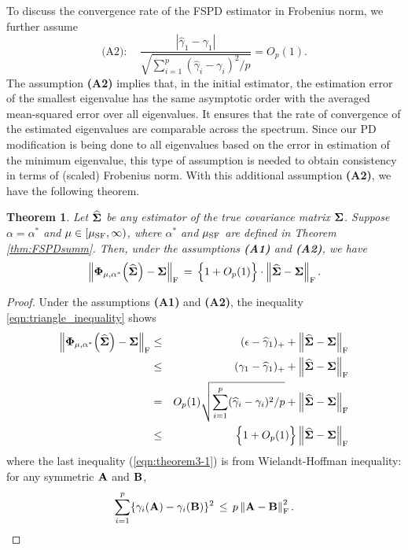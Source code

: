 \documentclass[times,sort&compress,3p]{elsarticle}
\newtheorem{theorem}{Theorem}
\begin{document}
To discuss the convergence rate of the FSPD estimator in Frobenius norm, we further assume
\[
\textrm{(A2)}: \quad \frac{  |{\widehat{\gamma}}_1 - \gamma_1 |}{ \sqrt{\sum_{i=1}^p ({\widehat{\gamma}}_i - \gamma_i)^2 / p} } = O_p ( 1). 
\]
The assumption {\bf (A2)} implies that, in the initial estimator, the estimation error of the smallest eigenvalue
has the same asymptotic order with the averaged mean-squared error over all eigenvalues. It 
ensures that the rate of convergence of the estimated eigenvalues are comparable across the spectrum. 
Since our PD modification is being done to all eigenvalues based on the error in estimation of the minimum 
eigenvalue, this type of assumption is needed to obtain consistency in terms of (scaled) Frobenius norm.
With this additional assumption {\bf (A2)}, we have the following theorem.
%
\begin{theorem}\label{prop:FSPDcov2} 
Let $\widehat{\bf \Sigma}$ be any estimator of the true covariance matrix ${\bf \Sigma}$. Suppose 
$\alpha=\alpha^*$ and $\mu \in [\mu_{\rm SF}, \infty)$, where $\alpha^*$ and $\mu_{\rm SF}$
are defined in Theorem \ref{thm:FSPDsumm}. Then, under the assumptions {\bf (A1)} and {\bf (A2)}, 
we have 
\[
\left\| {\bf \Phi}_{\mu, \alpha^*}\Big(\widehat{\bf \Sigma}\Big) - {\bf \Sigma} \right\|_{\rm F} \,=\,  
	\Big\{ 1 + O_p(1) \Big\} \cdot
	\left\| \widehat{\bf \Sigma} - {\bf \Sigma} \right\|_{\rm F}.
\]
\end{theorem}
\begin{proof}
Under the assumptions {\bf (A1)} and {\bf (A2)}, the inequality \eqref{eqn:triangle_inequality} shows 
\begin{eqnarray}
\left\| {\bf \Phi}_{\mu, \alpha^*}\Big(\widehat{\bf \Sigma}\Big) - {\bf \Sigma} \right\|_{\rm F} &\leq&
	(\epsilon - {\widehat{\gamma}}_1)_+  +  \left\| \widehat{\bf \Sigma} - {\bf \Sigma} \right\|_{\rm F}\nonumber\\
 	&\leq& (\gamma_1 - {\widehat{\gamma}}_1)_+  +  \left\| \widehat{\bf \Sigma} - {\bf \Sigma} \right\|_{\rm F} \nonumber \\
&=&  O_p (1) \sqrt{\sum_{i=1}^p ({\widehat{\gamma}}_i - \gamma_i)^2 / p}+  \left\| \widehat{\bf \Sigma} - {\bf \Sigma}
\right\|_{\rm F} \nonumber \\
&\le & \Big\{ 1 + O_p(1) \Big\}    \left\| \widehat{\bf \Sigma} - {\bf \Sigma} \label{eqn:theorem3-1}
\right\|_{\rm F}
\end{eqnarray}
where the last inequality (\ref{eqn:theorem3-1}) is from Wielandt-Hoffman inequality: for any  symmetric $\bf A$ and $\bf B$,
\[
\sum_{i=1}^{p} \{ \gamma_i({\bf A}) - \gamma_i({\bf B}) \}^2 \,\leq\, p \left\|{\bf A} - {\bf B}\right\|_{\rm F}^2.
\]
\end{proof}
\end{document}
